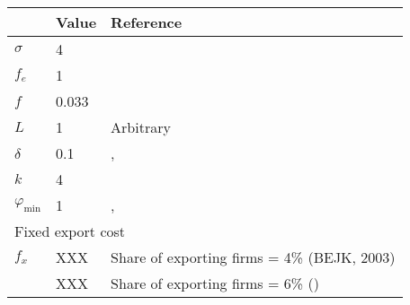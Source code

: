 \begin{tabular}{lll}
& Value & Reference\\
\hline
$\sigma$ & 4 & \cite{Irrazabal_2015}\\
$f_e$ & 1 & \cite{ghironi}\\
$f$ & 0.033 & \cite{ghironi} \\
$L$ & 1 & Arbitrary\\
$\delta$ & 0.1 & \cite{ghironi}, \cite{Irrazabal_2015}\\
$k$ & 4 \\
$\varphi_{\text{min}}$ & 1 & \cite{ghironi}, \cite{Irrazabal_2015}\\ \hline
\multicolumn{3}{l}{Fixed export cost } \\
$f_x $ & XXX & Share of exporting firms = 4\% (BEJK, 2003) \\
& XXX& Share of exporting firms = 6\% (\cite{Lincoln_McCallum2018}) \\
\hline
\end{tabular} 